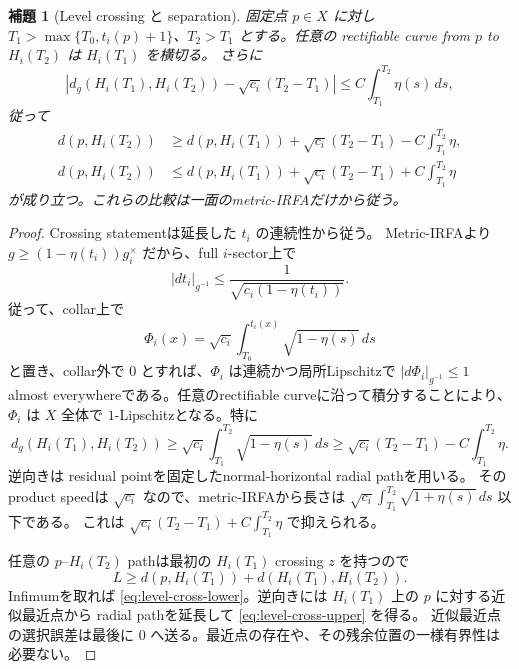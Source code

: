 \documentclass[11pt,a4paper]{ltjsarticle}
\theoremstyle{plain}
\newtheorem{lemma}[lemma]{補題}
\theoremstyle{definition}
\theoremstyle{remark}
\begin{document}
\begin{lemma}[Level crossing と separation]
\label{lem:level}
固定点 $p\in X$ に対し $T_1>\max\{T_0,t_i(p)+1\}$、$T_2>T_1$ とする。任意の rectifiable curve from $p$ to $H_i(T_2)$ は $H_i(T_1)$ を横切る。
さらに
\begin{equation}
\label{eq:level-separation}
 \left|d_g(H_i(T_1),H_i(T_2))-\sqrt{c_i}(T_2-T_1)\right|
 \le C\int_{T_1}^{T_2}\eta(s)\,ds,
\end{equation}
従って
\begin{align}
 d(p,H_i(T_2))
 &\ge d(p,H_i(T_1))
   +\sqrt{c_i}(T_2-T_1)
   -C\int_{T_1}^{T_2}\eta,\label{eq:level-cross-lower}\\
 d(p,H_i(T_2))
 &\le d(p,H_i(T_1))
   +\sqrt{c_i}(T_2-T_1)
   +C\int_{T_1}^{T_2}\eta\label{eq:level-cross-upper}
\end{align}
が成り立つ。これらの比較は一面のmetric-IRFAだけから従う。
\end{lemma}
\begin{proof}
Crossing statementは延長した $t_i$ の連続性から従う。
Metric-IRFAより $g\ge(1-\eta(t_i))g_i^\times$ だから、full $i$-sector上で
\[
 |dt_i|_{g^{-1}}\le \frac{1}{\sqrt{c_i(1-\eta(t_i))}}.
\]
従って、collar上で
\[
 \Phi_i(x)=\sqrt{c_i}\int_{T_0}^{t_i(x)}\sqrt{1-\eta(s)}\,ds
\]
と置き、collar外で $0$ とすれば、$\Phi_i$ は連続かつ局所Lipschitzで
$|d\Phi_i|_{g^{-1}}\le1$ almost everywhereである。任意のrectifiable curveに沿って積分することにより、$\Phi_i$ は $X$ 全体で $1$-Lipschitzとなる。特に
\[
 d_g(H_i(T_1),H_i(T_2))
 \ge\sqrt{c_i}\int_{T_1}^{T_2}\sqrt{1-\eta(s)}\,ds
 \ge\sqrt{c_i}(T_2-T_1)-C\int_{T_1}^{T_2}\eta.
\]
逆向きは residual pointを固定したnormal-horizontal radial pathを用いる。
そのproduct speedは $\sqrt{c_i}$ なので、metric-IRFAから長さは
$\sqrt{c_i}\int_{T_1}^{T_2}\sqrt{1+\eta(s)}\,ds$ 以下である。
これは $\sqrt{c_i}(T_2-T_1)+C\int_{T_1}^{T_2}\eta$ で抑えられる。

任意の $p$--$H_i(T_2)$ pathは最初の $H_i(T_1)$ crossing $z$ を持つので
\[
 L\ge d(p,H_i(T_1))+d(H_i(T_1),H_i(T_2)).
\]
Infimumを取れば \eqref{eq:level-cross-lower}。逆向きには $H_i(T_1)$ 上の $p$ に対する近似最近点から radial pathを延長して \eqref{eq:level-cross-upper} を得る。
近似最近点の選択誤差は最後に $0$ へ送る。最近点の存在や、その残余位置の一様有界性は必要ない。
\end{proof}
\end{document}
